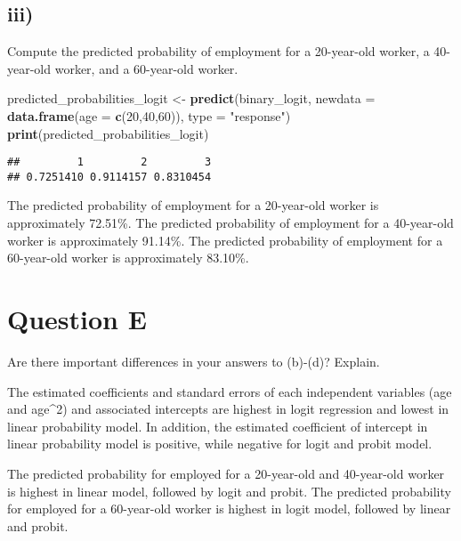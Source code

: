 \documentclass[
]{article}
\newenvironment{Shaded}{\begin{snugshade}}{\end{snugshade}}
\newcommand{\AttributeTok}[1]{\textcolor[rgb]{0.13,0.29,0.53}{#1}}
\newcommand{\DecValTok}[1]{\textcolor[rgb]{0.00,0.00,0.81}{#1}}
\newcommand{\FunctionTok}[1]{\textcolor[rgb]{0.13,0.29,0.53}{\textbf{#1}}}
\newcommand{\NormalTok}[1]{#1}
\newcommand{\OtherTok}[1]{\textcolor[rgb]{0.56,0.35,0.01}{#1}}
\newcommand{\StringTok}[1]{\textcolor[rgb]{0.31,0.60,0.02}{#1}}
\begin{document}
\hypertarget{iii-2}{%
\subsection{iii)}\label{iii-2}}

Compute the predicted probability of employment for a 20-year-old
worker, a 40-year-old worker, and a 60-year-old worker.

\begin{Shaded}
\begin{Highlighting}[]
\NormalTok{predicted\_probabilities\_logit }\OtherTok{\textless{}{-}} \FunctionTok{predict}\NormalTok{(binary\_logit, }
                                         \AttributeTok{newdata =} \FunctionTok{data.frame}\NormalTok{(}\AttributeTok{age =} \FunctionTok{c}\NormalTok{(}\DecValTok{20}\NormalTok{,}\DecValTok{40}\NormalTok{,}\DecValTok{60}\NormalTok{)), }
                                         \AttributeTok{type =} \StringTok{"response"}\NormalTok{)}
\FunctionTok{print}\NormalTok{(predicted\_probabilities\_logit)}
\end{Highlighting}
\end{Shaded}

\begin{verbatim}
##         1         2         3 
## 0.7251410 0.9114157 0.8310454
\end{verbatim}

The predicted probability of employment for a 20-year-old worker is
approximately 72.51\%. The predicted probability of employment for a
40-year-old worker is approximately 91.14\%. The predicted probability
of employment for a 60-year-old worker is approximately 83.10\%.

\hypertarget{question-e}{%
\section{Question E}\label{question-e}}

Are there important differences in your answers to (b)-(d)? Explain.
\vspace{1em}

The estimated coefficients and standard errors of each independent
variables (age and age\^{}2) and associated intercepts are highest in
logit regression and lowest in linear probability model. In addition,
the estimated coefficient of intercept in linear probability model is
positive, while negative for logit and probit model.

The predicted probability for employed for a 20-year-old and 40-year-old
worker is highest in linear model, followed by logit and probit. The
predicted probability for employed for a 60-year-old worker is highest
in logit model, followed by linear and probit.
\end{document}
